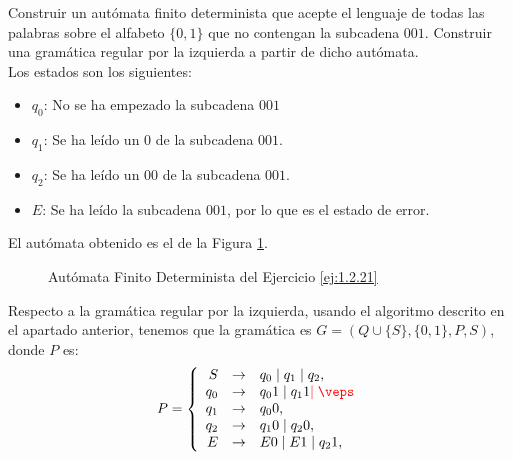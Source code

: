 \begin{ejercicio} \label{ej:1.2.21}
    Construir un autómata finito determinista que acepte el lenguaje de todas las palabras sobre el alfabeto $\{0, 1\}$ que no contengan la subcadena $001$.
    Construir una gramática regular por la izquierda a partir de dicho autómata.\\

    Los estados son los siguientes:
    \begin{itemize}
        \item \ul{$q_0$}: No se ha empezado la subcadena $001$
        \item \ul{$q_1$}: Se ha leído un $0$ de la subcadena $001$.
        \item \ul{$q_2$}: Se ha leído un $00$ de la subcadena $001$.
        \item \ul{$E$}: Se ha leído la subcadena $001$, por lo que es el estado de error.
    \end{itemize}

    El autómata obtenido es el de la Figura \ref{fig:ej:1.2.21}.
    \begin{figure}
        \centering
        \caption{Autómata Finito Determinista del Ejercicio \ref{ej:1.2.21}}
        \label{fig:ej:1.2.21}
    \end{figure}
    
    Respecto a la gramática regular por la izquierda, usando el algoritmo descrito en el apartado anterior, tenemos que la gramática es $G=(Q\cup \{S\}, \{0, 1\}, P, S)$, donde $P$ es:
    \begin{align*}
        P=\left\{
            \begin{array}{rcll}
                S &\to& q_0 \mid q_1 \mid q_2,\\
                q_0 &\to& q_0 1 \mid q_1 1 \red{\mid \veps}\\
                q_1 &\to& q_0 0,\\
                q_2 &\to& q_1 0 \mid q_2 0,\\
                E &\to& E0 \mid E1 \mid q_2 1,
            \end{array}
        \right.
    \end{align*}

\end{ejercicio}

